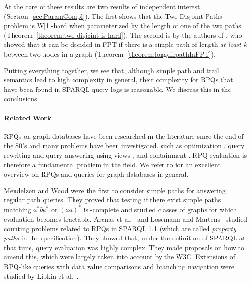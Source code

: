 \documentclass[a4paper,english]{lipics-v2016}
\theoremstyle{plain}
\begin{document}
\begin{compactenum}
\item At the core of these results are two results of independent
  interest (Section~\ref{sec:ParamCompl}). The first shows that the
  \textsf{Two Disjoint Paths} problem is W[1]-hard when parameterized
  by the length of one of the two paths
  (Theorem~\ref{theorem:two-disjoint-is-hard}). The second
  is by the authors of \cite{fomin}, who showed that it can be decided
  in FPT if there is a simple path of length \emph{at least $k$}
  between two nodes in a graph
  (Theorem~\ref{theorem:longdirpathInFPT}).

\end{compactenum}

Putting everything together, we see that, although simple path and trail
semantics lead to high complexity in general, their complexity for
RPQs that have been found in SPARQL query logs is reasonable. We
discuss this in the conclusions.









\paragraph*{Related Work}
RPQs on graph databases have been
  researched in the literature since the end of the 80's
  \cite{ConsensM-pods90,CruzMW-sigmod87,Yannakakis-pods90}
and many problems have been investigated, such as optimization \cite{AbiteboulV-jcss99},
 query rewriting and query answering using views
 \cite{CalvaneseGLV-jcss02,CalvaneseGLV-pods00}, 
and containment
\cite{CalvaneseGLV-kr00,DeutschT-dbpl01,FlorescuLS-pods98}. RPQ
evaluation is therefore a fundamental problem in the field. We refer
to \cite{Barcelo-pods13}
for an excellent overview on RPQs and queries for graph databases in general.

Mendelzon and Wood \cite{mendelzon} were the first to consider simple
paths for answering regular path queries. They proved that testing if
there exist simple paths matching $a^* b a^*$ or $(aa)^*$ is
\np-complete and studied classes of graphs for which evaluation
becomes tractable. Arenas et al.~\cite{ArenasCP-www12} and Losemann
and Martens~\cite{LosemannM-tods13} studied counting problems related
to RPQs in SPARQL 1.1 (which are called \emph{property paths} in the
specification). They showed that, under the definition 
of SPARQL at
that time, query evaluation was highly complex. They made proposals on
how to amend this, which were largely taken into account by the W3C.
Extensions of RPQ-like queries with data value comparisons and
branching navigation were studied by Libkin et al.\ \cite{LibkinMV-jacm16}.
\end{document}
